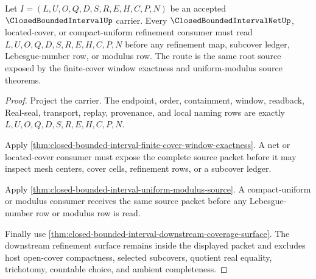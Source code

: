 \begin{theorem}
\label{thm:closed-bounded-interval-root-cover-refinement-source}
Let $I=(L,U,O,Q,D,S,R,E,H,C,P,N)$ be an accepted $\ClosedBoundedIntervalUp$ carrier. Every $\ClosedBoundedIntervalNetUp$, located-cover, or compact-uniform refinement consumer must read $L,U,O,Q,D,S,R,E,H,C,P,N$ before any refinement map, subcover ledger, Lebesgue-number row, or modulus row. The route is the same root source exposed by the finite-cover window exactness and uniform-modulus source theorems.
\end{theorem}
\begin{proof}
Project the carrier. The endpoint, order, containment, window, readback, Real-seal, transport, replay, provenance, and local naming rows are exactly $L,U,O,Q,D,S,R,E,H,C,P,N$.

Apply \autoref{thm:closed-bounded-interval-finite-cover-window-exactness}. A net or located-cover consumer must expose the complete source packet before it may inspect mesh centers, cover cells, refinement rows, or a subcover ledger.

Apply \autoref{thm:closed-bounded-interval-uniform-modulus-source}. A compact-uniform or modulus consumer receives the same source packet before any Lebesgue-number row or modulus row is read.

Finally use \autoref{thm:closed-bounded-interval-downstream-coverage-surface}. The downstream refinement surface remains inside the displayed packet and excludes host open-cover compactness, selected subcovers, quotient real equality, trichotomy, countable choice, and ambient completeness.
\end{proof}

